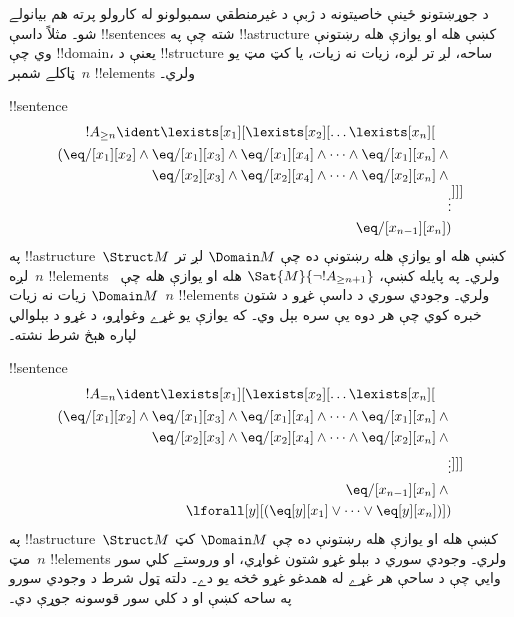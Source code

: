 \documentclass[../../../include/open-logic-section]{subfiles}
\begin{document}


\begin{explain}
د جوړښتونو ځينې خاصيتونه د ژبې د غيرمنطقي سمبولونو له کارولو پرته
هم بيانولے شو۔ مثلاً داسې !!{sentence}s شته چې په !!a{structure}
کښې هله او يوازې هله رښتونې وي چې !!{domain}، يعنې د !!{structure}
ساحه، لږ تر لږه، زيات نه زيات، يا کټ مټ يو ټاکلے شمېر~$n$
!!{element}s ولري۔
\end{explain}

\begin{prop}
!!{sentence}
\begin{multline*}
  !A_{\ge n} \ident \lexists[x_1][\lexists[x_2][\dots\lexists[x_n][{}\\
  \begin{aligned}
  (\eq/[x_1][x_2] \land {}
  \eq/[x_1][x_3] \land \eq/[x_1][x_4] \land \dots \land \eq/[x_1][x_n] \land {}\\
\eq/[x_2][x_3] \land \eq/[x_2][x_4] \land \dots \land {} \eq/[x_2][x_n] \land {} \\
\vdots\\
\eq/[x_{n-1}][x_n])
\end{aligned}]]]
\end{multline*}
په !!a{structure}~$\Struct M$ کښې هله او يوازې هله رښتونې ده چې
$\Domain M$ لږ تر لږه~$n$ !!{element}s ولري۔ په پايله کښې،
$\Sat{M}{\lnot !A_{\ge n+1}}$ هله او يوازې هله چې~$\Domain M$
زيات نه زيات~$n$ !!{element}s ولري۔
وجودي سوري د داسې غړو د شتون خبره کوي چې هر دوه يې سره بېل وي۔
که يوازې يو غړے وغواړو، د غړو د بېلوالي لپاره هېڅ شرط نشته۔

\end{prop}

\begin{prop}
!!{sentence}
\begin{multline*}
!A_{= n} \ident \lexists[x_1][\lexists[x_2][\dots\lexists[x_n][{} \\
\begin{aligned}
  (\eq/[x_1][x_2] \land {}
  \eq/[x_1][x_3] \land \eq/[x_1][x_4] \land \dots \land \eq/[x_1][x_n] \land {}\\
\eq/[x_2][x_3] \land \eq/[x_2][x_4] \land \dots \land {} \eq/[x_2][x_n] \land {} \\
\vdots\\
\eq/[x_{n-1}][x_n] \land {} \\
\lforall[y][(\eq[y][x_1] \lor \dots \lor \eq[y][x_n])])
\end{aligned}]]]
\end{multline*}
په !!a{structure}~$\Struct M$ کښې هله او يوازې هله رښتونې ده چې
$\Domain M$ کټ مټ~$n$ !!{element}s ولري۔
وجودي سوري د بېلو غړو شتون غواړي، او وروستے کلي سور وايي چې
د ساحې هر غړے له همدغو غړو څخه يو دے۔
دلته ټول شرط د وجودي سورو په ساحه کښې او د کلي سور قوسونه جوړې دي۔
\end{prop}
\end{document}

